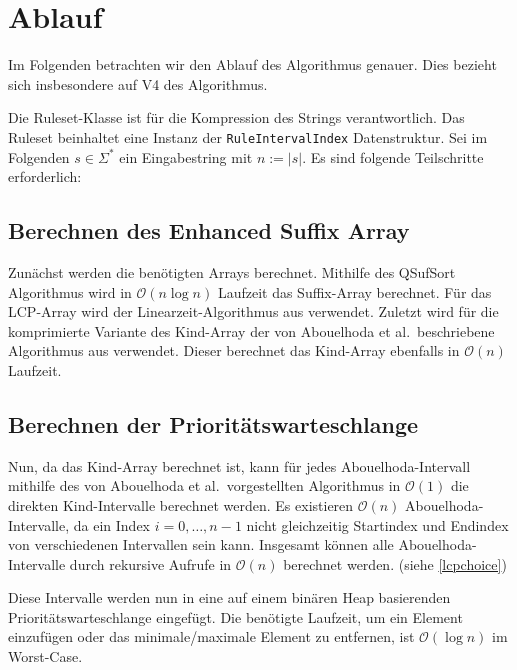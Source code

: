 \section{Ablauf}

Im Folgenden betrachten wir den Ablauf des Algorithmus genauer. Dies bezieht sich insbesondere auf V4 des Algorithmus.

Die Ruleset-Klasse ist für die Kompression des Strings verantwortlich. Das Ruleset beinhaltet eine Instanz der \texttt{RuleIntervalIndex} Datenstruktur. Sei im Folgenden $s \in \Sigma^*$ ein Eingabestring mit $n := |s|$. Es sind folgende Teilschritte erforderlich:

\subsection{Berechnen des Enhanced Suffix Array}

Zunächst werden die benötigten Arrays berechnet. Mithilfe des QSufSort Algorithmus \cite{larsson_faster_2007} wird in $\mathcal{O}(n \log n)$ Laufzeit das Suffix-Array berechnet. Für das LCP-Array wird der Linearzeit-Algorithmus aus \cite{kasai_linear-time_2001} verwendet. Zuletzt wird für die komprimierte Variante des Kind-Array der von Abouelhoda et al.\ beschriebene Algorithmus aus \cite{abouelhoda_optimal_2002} verwendet. Dieser berechnet das Kind-Array ebenfalls in $\mathcal{O}(n)$ Laufzeit.

\subsection{Berechnen der Prioritätswarteschlange}
\label{calcqueue}

Nun, da das Kind-Array berechnet ist, kann für jedes Abouelhoda-Intervall mithilfe des von Abouelhoda et al.\ vorgestellten Algorithmus in $\mathcal{O}(1)$ die direkten Kind-Intervalle berechnet werden. Es existieren $\mathcal{O}(n)$ Abouelhoda-Intervalle, da ein Index $i = 0,\dots,n - 1$ nicht gleichzeitig Startindex und Endindex von verschiedenen Intervallen sein kann. Insgesamt können alle Abouelhoda-Intervalle durch rekursive Aufrufe in $\mathcal{O}(n)$ berechnet werden. (siehe \autoref{lcpchoice})

Diese Intervalle werden nun in eine auf einem binären Heap \cite{williams_algorithm_1964} basierenden Prioritätswarteschlange eingefügt. Die benötigte Laufzeit, um ein Element einzufügen oder das minimale/maximale Element zu entfernen, ist $\mathcal{O}(\log n)$ im Worst-Case.

